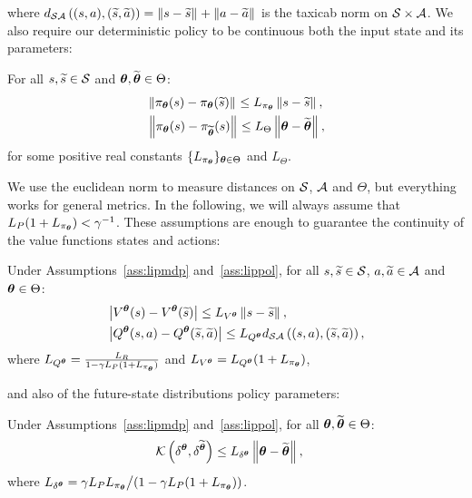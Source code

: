 %
\noindent where $d_{\mathcal{S}\mathcal{A}}\left((s,a),(\widetilde{s},\widetilde{a})\right) = \left\|s-\widetilde{s}\right\|_{} + \left\|a-\widetilde{a}\right\|_{}$ is the taxicab norm on $\mathcal{S}\times\mathcal{A}$.
We also require our deterministic policy to be continuous both \wrt the input state and its parameters:
%
\begin{assumption}\label{ass:lippol}
	For all $s,\widetilde{s}\in\mathcal{S}$ and $\boldsymbol{\theta},\widetilde{\boldsymbol{\theta}}\in\Theta$:
	\begin{align}
	&\left\|\pi_{\boldsymbol{\theta}}(s) - \pi_{\boldsymbol{\theta}}(\widetilde{s})\right\|_{} \leq L_{\pi_{\boldsymbol{\theta}}}\left\|s-\widetilde{s}\right\|_{}, \\
	&\left\|\pi_{\boldsymbol{\theta}}(s) - \pi_{\widetilde{\boldsymbol{\theta}}}(s)\right\|_{} \leq L_{\Theta}\left\|\boldsymbol{\theta}-\widetilde{\boldsymbol{\theta}}\right\|_{},
	\end{align}
	for some positive real constants $\{L_{\pi_{\boldsymbol{\theta}}}\}_{\boldsymbol{\theta}\in\Theta}$ and $L_{\Theta}$.
\end{assumption}
%
\noindent We use the euclidean norm to measure distances on $\mathcal{S}$, $\mathcal{A}$ and $\Theta$, but everything works for general metrics.
In the following, we will always assume that ${L_{P}(1+L_{\pi_{\boldsymbol{\theta}}}) < \gamma^{-1}}$.
These assumptions are enough to guarantee the continuity of the value functions \wrt states and actions:
%
\begin{lemma}\label{lem:lipval}
	Under Assumptions~\ref{ass:lipmdp} and~\ref{ass:lippol}, for all $s,\widetilde{s}\in\mathcal{S}$, $a,\widetilde{a}\in\mathcal{A}$ and $\boldsymbol{\theta}\in\Theta$:
	\begin{align}
	&\left|V^{\boldsymbol{\theta}}(s) - V^{\boldsymbol{\theta}}(\widetilde{s})\right| \leq L_{V^{\boldsymbol{\theta}}}\left\|s-\widetilde{s}\right\|_{}, \\
	&\left|Q^{\boldsymbol{\theta}}(s,a) - Q^{\boldsymbol{\theta}}(\widetilde{s},\widetilde{a})\right| \leq L_{Q^{\boldsymbol{\theta}}}d_{\mathcal{S}\mathcal{A}}\left((s,a),(\widetilde{s},\widetilde{a})\right),
	\end{align}
	where $L_{Q^{\boldsymbol{\theta}}} = \frac{L_{R}}{1-\gamma L_{P}(1+L_{\pi_{\boldsymbol{\theta}}})}$ and $L_{V^{\boldsymbol{\theta}}} = L_{Q^{\boldsymbol{\theta}}}(1+L_{\pi_{\boldsymbol{\theta}}})$,
\end{lemma}
%
\noindent and also of the future-state distributions \wrt policy parameters:
%
\begin{lemma}\label{lem:lipfut}
	Under Assumptions~\ref{ass:lipmdp} and~\ref{ass:lippol}, for all $\boldsymbol{\theta},\widetilde{\boldsymbol{\theta}}\in\Theta$:
	\begin{align}
	&\mathcal{K}\left(\delta^{\boldsymbol{\theta}},\delta^{\widetilde{\boldsymbol{\theta}}}\right) \leq L_{\delta^{\boldsymbol{\theta}}}\left\|\boldsymbol{\theta}-\widetilde{\boldsymbol{\theta}}\right\|_{},
	\end{align}
	where $L_{\delta^{\boldsymbol{\theta}}} = {\gamma L_{P}L_{\pi_{\boldsymbol{\theta}}}}\big/{\left(1-\gamma L_{P}(1+L_{\pi_{\boldsymbol{\theta}}})\right)}$.
\end{lemma}

